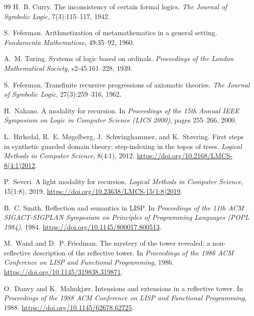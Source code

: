 \documentclass[11pt]{article}
\theoremstyle{definition}
\theoremstyle{remark}
\begin{document}
\begin{thebibliography}{99}
H.~B. Curry.
\newblock The inconsistency of certain formal logics.
\newblock \emph{The Journal of Symbolic Logic}, 7(3):115--117, 1942.

S.~Feferman.
\newblock Arithmetization of metamathematics in a general setting.
\newblock \emph{Fundamenta Mathematicae}, 49:35--92, 1960.

A.~M. Turing.
\newblock Systems of logic based on ordinals.
\newblock \emph{Proceedings of the London Mathematical Society}, s2-45:161--228,
  1939.

S.~Feferman.
\newblock Transfinite recursive progressions of axiomatic theories.
\newblock \emph{The Journal of Symbolic Logic}, 27(3):259--316, 1962.

H.~Nakano.
\newblock A modality for recursion.
\newblock In \emph{Proceedings of the 15th Annual IEEE Symposium on Logic in
  Computer Science (LICS 2000)}, pages 255--266, 2000.

L.~Birkedal, R.~E. M{\o}gelberg, J.~Schwinghammer, and K.~St{\o}vring.
\newblock First steps in synthetic guarded domain theory: step-indexing in the
  topos of trees.
\newblock \emph{Logical Methods in Computer Science}, 8(4:1), 2012.
\newblock \url{https://doi.org/10.2168/LMCS-8(4:1)2012}.

P.~Severi.
\newblock A light modality for recursion.
\newblock \emph{Logical Methods in Computer Science}, 15(1:8), 2019.
\newblock \url{https://doi.org/10.23638/LMCS-15(1:8)2019}.

B.~C. Smith.
\newblock Reflection and semantics in {LISP}.
\newblock In \emph{Proceedings of the 11th ACM SIGACT-SIGPLAN Symposium on
  Principles of Programming Languages (POPL 1984)}, 1984.
\newblock \url{https://doi.org/10.1145/800017.800513}.

M.~Wand and D.~P. Friedman.
\newblock The mystery of the tower revealed: a non-reflective description of
  the reflective tower.
\newblock In \emph{Proceedings of the 1986 ACM Conference on LISP and
  Functional Programming}, 1986.
\newblock \url{https://doi.org/10.1145/319838.319871}.

O.~Danvy and K.~Malmkj{\ae}r.
\newblock Intensions and extensions in a reflective tower.
\newblock In \emph{Proceedings of the 1988 ACM Conference on LISP and
  Functional Programming}, 1988.
\newblock \url{https://doi.org/10.1145/62678.62725}.


\end{thebibliography}
\end{document}

